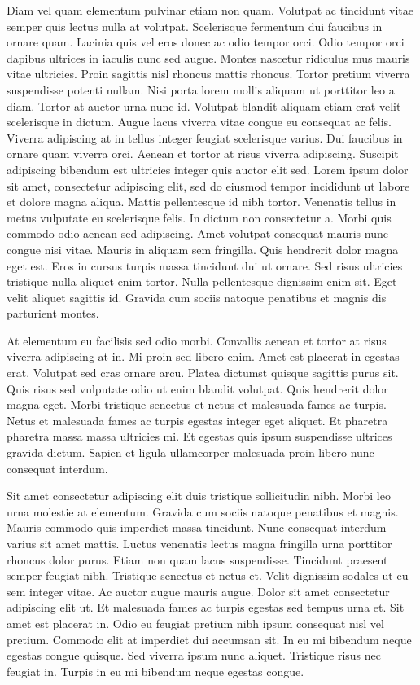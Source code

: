 \documentclass[11pt,a4paper]{article}
\begin{document}
Diam vel quam elementum pulvinar etiam non quam. Volutpat ac tincidunt vitae semper quis lectus nulla at volutpat. Scelerisque fermentum dui faucibus in ornare quam. Lacinia quis vel eros donec ac odio tempor orci. Odio tempor orci dapibus ultrices in iaculis nunc sed augue. Montes nascetur ridiculus mus mauris vitae ultricies. Proin sagittis nisl rhoncus mattis rhoncus. Tortor pretium viverra suspendisse potenti nullam. Nisi porta lorem mollis aliquam ut porttitor leo a diam. Tortor at auctor urna nunc id. Volutpat blandit aliquam etiam erat velit scelerisque in dictum. Augue lacus viverra vitae congue eu consequat ac felis. Viverra adipiscing at in tellus integer feugiat scelerisque varius. Dui faucibus in ornare quam viverra orci. Aenean et tortor at risus viverra adipiscing. Suscipit adipiscing bibendum est ultricies integer quis auctor elit sed.
Lorem ipsum dolor sit amet, consectetur adipiscing elit, sed do eiusmod tempor incididunt ut labore et dolore magna aliqua. Mattis pellentesque id nibh tortor. Venenatis tellus in metus vulputate eu scelerisque felis. In dictum non consectetur a. Morbi quis commodo odio aenean sed adipiscing. Amet volutpat consequat mauris nunc congue nisi vitae. Mauris in aliquam sem fringilla. Quis hendrerit dolor magna eget est. Eros in cursus turpis massa tincidunt dui ut ornare. Sed risus ultricies tristique nulla aliquet enim tortor. Nulla pellentesque dignissim enim sit. Eget velit aliquet sagittis id. Gravida cum sociis natoque penatibus et magnis dis parturient montes.

At elementum eu facilisis sed odio morbi. Convallis aenean et tortor at risus viverra adipiscing at in. Mi proin sed libero enim. Amet est placerat in egestas erat. Volutpat sed cras ornare arcu. Platea dictumst quisque sagittis purus sit. Quis risus sed vulputate odio ut enim blandit volutpat. Quis hendrerit dolor magna eget. Morbi tristique senectus et netus et malesuada fames ac turpis. Netus et malesuada fames ac turpis egestas integer eget aliquet. Et pharetra pharetra massa massa ultricies mi. Et egestas quis ipsum suspendisse ultrices gravida dictum. Sapien et ligula ullamcorper malesuada proin libero nunc consequat interdum.

Sit amet consectetur adipiscing elit duis tristique sollicitudin nibh. Morbi leo urna molestie at elementum. Gravida cum sociis natoque penatibus et magnis. Mauris commodo quis imperdiet massa tincidunt. Nunc consequat interdum varius sit amet mattis. Luctus venenatis lectus magna fringilla urna porttitor rhoncus dolor purus. Etiam non quam lacus suspendisse. Tincidunt praesent semper feugiat nibh. Tristique senectus et netus et. Velit dignissim sodales ut eu sem integer vitae. Ac auctor augue mauris augue. Dolor sit amet consectetur adipiscing elit ut. Et malesuada fames ac turpis egestas sed tempus urna et. Sit amet est placerat in. Odio eu feugiat pretium nibh ipsum consequat nisl vel pretium. Commodo elit at imperdiet dui accumsan sit. In eu mi bibendum neque egestas congue quisque. Sed viverra ipsum nunc aliquet. Tristique risus nec feugiat in. Turpis in eu mi bibendum neque egestas congue.
\end{document}
